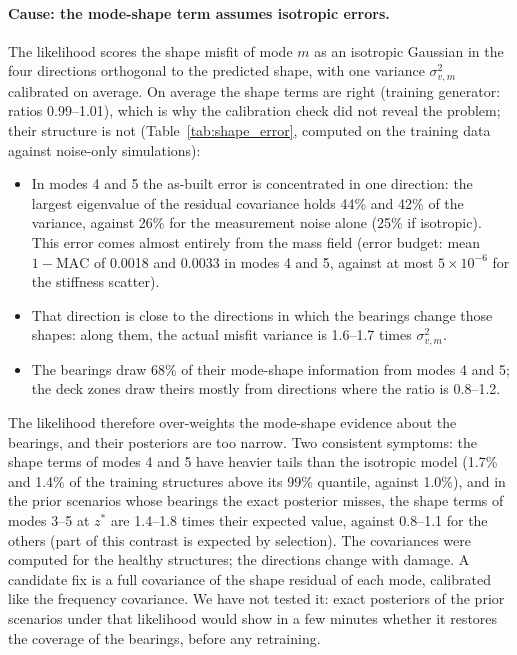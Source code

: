 \documentclass[11pt]{article}
\begin{document}
\paragraph{Cause: the mode-shape term assumes isotropic errors.} The likelihood scores the shape misfit of mode $m$ as an
isotropic Gaussian in the four directions orthogonal to the predicted shape, with one variance $\sigma_{v,m}^2$
calibrated on average. On average the shape terms are right (training generator: ratios 0.99--1.01), which is why the
calibration check did not reveal the problem; their structure is not (Table~\ref{tab:shape_error}, computed on the
training data against noise-only simulations):
\begin{itemize}
\item In modes 4 and 5 the as-built error is concentrated in one direction: the largest eigenvalue of the residual
covariance holds 44\% and 42\% of the variance, against 26\% for the measurement noise alone (25\% if isotropic). This
error comes almost entirely from the mass field (error budget: mean $1-\mathrm{MAC}$ of 0.0018 and 0.0033 in modes 4
and 5, against at most $5\times10^{-6}$ for the stiffness scatter).
\item That direction is close to the directions in which the bearings change those shapes: along them, the actual
misfit variance is 1.6--1.7 times $\sigma_{v,m}^2$.
\item The bearings draw 68\% of their mode-shape information from modes 4 and 5; the deck zones draw theirs mostly
from directions where the ratio is 0.8--1.2.
\end{itemize}
The likelihood therefore over-weights the mode-shape evidence about the bearings, and their posteriors are too narrow.
Two consistent symptoms: the shape terms of modes 4 and 5 have heavier tails than the isotropic model (1.7\% and 1.4\%
of the training structures above its 99\% quantile, against 1.0\%), and in the prior scenarios whose bearings the exact
posterior misses, the shape terms of modes 3--5 at $z^*$ are 1.4--1.8 times their expected value, against 0.8--1.1 for
the others (part of this contrast is expected by selection). The covariances were computed for the healthy structures;
the directions change with damage. A candidate fix is a full covariance of the shape residual of each mode, calibrated
like the frequency covariance. We have not tested it: exact posteriors of the prior scenarios under that likelihood
would show in a few minutes whether it restores the coverage of the bearings, before any retraining.
\end{document}
